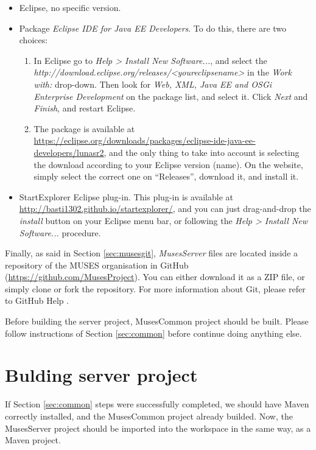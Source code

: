 \documentclass[a4paper,11pt]{book}
\begin{document}
\begin{itemize}
  \item Eclipse, no specific version.
  \item Package \textit{Eclipse IDE for Java EE Developers}. To do this, there are two choices:
  \begin{enumerate}
    \item In Eclipse go to \textit{Help > Install New Software...}, and select the \textit{http://download.eclipse.org/releases/<youreclipsename>} in the \textit{Work with:} drop-down. Then look for \textit{Web, XML, Java EE and OSGi Enterprise Development} on the package list, and select it. Click \textit{Next} and \textit{Finish}, and restart Eclipse.
    \item The package is available at \url{https://eclipse.org/downloads/packages/eclipse-ide-java-ee-developers/lunasr2}, and the only thing to take into account is selecting the download according to your Eclipse version (name). On the website, simply select the correct one on ``Releases'', download it, and install it.
  \end{enumerate} 
  \item StartExplorer Eclipse plug-in. This plug-in is available at \url{http://basti1302.github.io/startexplorer/}, and you can just drag-and-drop the \textit{install} button on your Eclipse menu bar, or following the \textit{Help > Install New Software...} procedure.
\end{itemize}

Finally, as said in Section \ref{sec:musesgit}, \textit{MusesServer} files are located inside a repository of the MUSES organisation in GitHub (\url{https://github.com/MusesProject}). You can either download it as a ZIP file, or simply clone or fork the repository. For more information about Git, please refer to GitHub Help \cite{githelp:site}.

Before building the server project, MusesCommon project should be built. Please follow instructions of Section \ref{sec:common} before continue doing anything else.

\section{Bulding server project}
\label{sec:buildserver}

If Section \ref{sec:common} steps were successfully completed, we should have Maven correctly installed, and the MusesCommon project already builded. Now, the MusesServer project should be imported into the workspace in the same way, as a Maven project.
\end{document}
